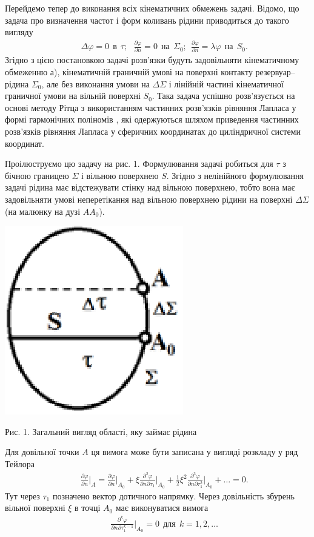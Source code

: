 \documentclass[11pt, reqno]{amsart}
\begin{document}
Перейдемо тепер до виконання всіх кінематичних обмежень задачі. Відомо, що задача про визначення частот і форм коливань рідини приводиться до такого вигляду
\begin{eqnarray}\label{6}
    &&\Delta \varphi=0 \ \ \mbox{в} \ \ \tau; \ \ \ \frac{\partial \varphi}{\partial n}=0 \ \ \mbox{на} \ \ \Sigma_0; \ \ \frac{\partial \varphi}{\partial n}=\lambda \varphi \ \
        \mbox{на} \ \ S_0.
\end{eqnarray}
Згідно з цією постановкою задачі розв'язки будуть задовільняти кінематичному обмеженню а), кінематичній граничній умові на поверхні контакту резервуар--рідина $\Sigma_0$, але без виконання умови на $\Delta \Sigma$ і лінійній частині кінематичної граничної умови на вільній поверхні $S_0$. Така задача успішно розв'язується на основі методу Рітца з використанням частинних розв'язків рівняння Лапласа у формі гармонічних поліномів \cite{Limbo}, які одержуються шляхом приведення частинних розв'язків рівняння Лапласа у сферичних координатах до циліндричної системи координат.

Проілюструємо цю задачу на рис. 1. Формулювання задачі робиться для  $\tau$ з бічною границею $\Sigma$ і вільною поверхнею $S$. Згідно з нелінійного формулювання задачі рідина має відстежувати стінку над вільною поверхнею, тобто вона має задовільняти умові неперетікання над вільною поверхнею рідини на поверхні  $\Delta \Sigma$ (на малюнку на дузі $AA_0$).

\vspace{+0,2cm}
\begin{center}
\includegraphics[width=0.2 \linewidth]{ger_1.eps}

{Рис. 1. Загальний вигляд області, яку займає рідина}
\end{center}

\vspace{+0,2cm}

Для довільної точки $A$ ця вимога може бути записана у вигляді розкладу у ряд Тейлора
\begin{eqnarray*}
   &&\frac{\partial \varphi}{\partial n}\bigg |_A = \frac{\partial \varphi}{\partial n}\bigg |_{A_0} +
       \xi \frac{\partial^2 \varphi}{\partial n \partial \tau_1}\bigg |_{A_0}+
       \frac{1}{2}\xi^2 \frac{\partial^3 \varphi}{\partial n \partial \tau_1^2}\bigg |_{A_0}+ \ldots =0.
\end{eqnarray*}
Тут через $\tau_1$ позначено вектор дотичного напрямку. Через довільність збурень вільної поверхні  $\xi$ в точці $A_0$ має виконуватися вимога
\begin{eqnarray*}
    &&\frac{\partial^k \varphi}{\partial n \partial \tau_1^{k-1}}\bigg |_{A_0} =0 \ \ \mbox{для} \ \ k=1,2, \ldots
\end{eqnarray*}
\end{document}
